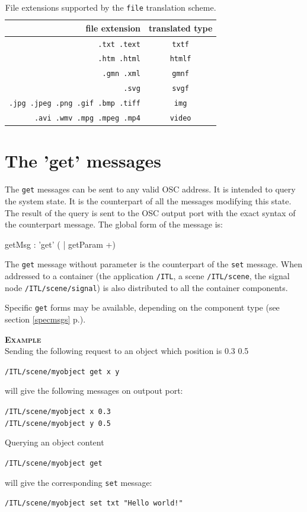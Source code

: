 \documentclass[a4paper,twoside]{report}
\newcommand{\toplevel}[1]	{\chapter{#1}}
\newcommand{\sublevel}[1]	{\section{#1}}
\newcommand{\fullref}[1]	{\ref{#1} p.\pageref{#1}}
\newcommand{\OSC}[1]		{\texttt{#1}}
\newcommand{\example}		{\textbf{\hspace{-1.5cm}\textbf{\textsc{Example }}}}
\newcommand{\sample}	[1]			{\vspace{-2mm}\begin{center}\colorbox{mygrey}{
								\begin{minipage}[t]{0.9\columnwidth} 
								{\small \texttt{#1}}
								\end{minipage}}\end{center}}
\newcommand{\sampleindent}	{ \hspace{0.5cm} }
\begin{document}
\begin{table}[htdp]
\caption{File extensions supported by the \OSC{file} translation scheme.}
\begin{center}
\begin{tabular}{|r|c|}
\hline
file extension & translated type \\
\hline
\OSC{.txt .text}		& \OSC{txtf} \\
\OSC{.htm .html}		& \OSC{htmlf} \\
\OSC{.gmn .xml}		& \OSC{gmnf} \\
\OSC{.svg} 			& \OSC{svgf} \\
\OSC{.jpg .jpeg .png .gif .bmp .tiff} & \OSC{img} \\
\OSC{.avi .wmv .mpg .mpeg .mp4} & \OSC{video} \\
\hline
\end{tabular}
\end{center}
\label{fileTranslate}
\end{table}


\toplevel{The 'get' messages}
\label{getsect}

The \OSC{get} messages can be sent to any valid OSC address. It is intended to query the system state. It is the counterpart of all the messages modifying this state.  The result of the query is sent to the OSC output port with the exact syntax of the counterpart message. 
The global form of the message is:
\begin{rail}
getMsg : 'get' ( | getParam +)
\end{rail}

The \OSC{get} message without parameter is the counterpart of the \OSC{set} message. When addressed to a container (the application \OSC{/ITL}, a scene \OSC{/ITL/scene}, the signal node \OSC{/ITL/scene/signal}) is also distributed to all the container components.

Specific \OSC{get} forms may be available, depending on the component type (see section \fullref{specmsgs}).

\example \\
Sending the following request to an object which position is 0.3 0.5
\sample{/ITL/scene/myobject get x y}
\sampleindent will give the following messages on outpout port:
\sample{/ITL/scene/myobject x 0.3 \\
/ITL/scene/myobject y 0.5}
Querying an object content
\sample{/ITL/scene/myobject get}
\sampleindent will give the corresponding \OSC{set} message:
\sample{/ITL/scene/myobject set txt "Hello world!"}
\end{document}
